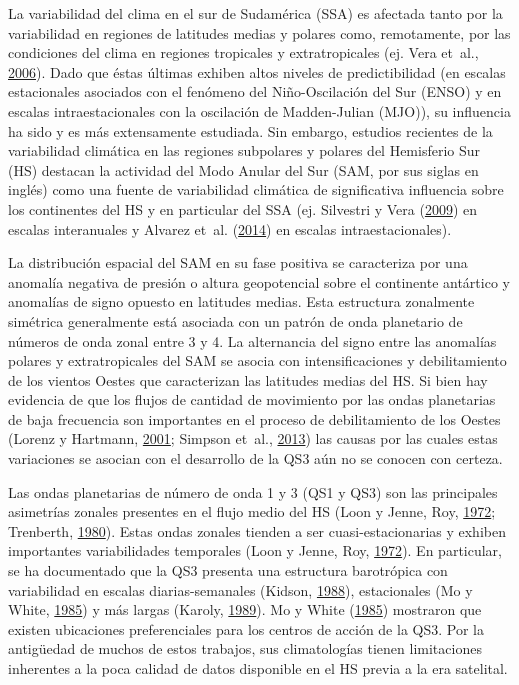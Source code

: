 \documentclass[spanish,a4paper,12pt,oneside]{book}
\begin{document}
La variabilidad del clima en el sur de Sudamérica (SSA) es afectada
tanto por la variabilidad en regiones de latitudes medias y polares
como, remotamente, por las condiciones del clima en regiones tropicales
y extratropicales (ej. Vera et~al.,
\protect\hyperlink{ref-Vera2006}{2006}). Dado que éstas últimas exhiben
altos niveles de predictibilidad (en escalas estacionales asociados con
el fenómeno del Niño-Oscilación del Sur (ENSO) y en escalas
intraestacionales con la oscilación de Madden-Julian (MJO)), su
influencia ha sido y es más extensamente estudiada. Sin embargo,
estudios recientes de la variabilidad climática en las regiones
subpolares y polares del Hemisferio Sur (HS) destacan la actividad del
Modo Anular del Sur (SAM, por sus siglas en inglés) como una fuente de
variabilidad climática de significativa influencia sobre los continentes
del HS y en particular del SSA (ej. Silvestri y Vera
(\protect\hyperlink{ref-Silvestri2009}{2009}) en escalas interanuales y
Alvarez et~al. (\protect\hyperlink{ref-Alvarez2014}{2014}) en escalas
intraestacionales).

La distribución espacial del SAM en su fase positiva se caracteriza por
una anomalía negativa de presión o altura geopotencial sobre el
continente antártico y anomalías de signo opuesto en latitudes medias.
Esta estructura zonalmente simétrica generalmente está asociada con un
patrón de onda planetario de números de onda zonal entre 3 y 4. La
alternancia del signo entre las anomalías polares y extratropicales del
SAM se asocia con intensificaciones y debilitamiento de los vientos
Oestes que caracterizan las latitudes medias del HS. Si bien hay
evidencia de que los flujos de cantidad de movimiento por las ondas
planetarias de baja frecuencia son importantes en el proceso de
debilitamiento de los Oestes (Lorenz y Hartmann,
\protect\hyperlink{ref-Lorenz2001}{2001}; Simpson et~al.,
\protect\hyperlink{ref-Simpson2013}{2013}) las causas por las cuales
estas variaciones se asocian con el desarrollo de la QS3 aún no se
conocen con certeza.

Las ondas planetarias de número de onda 1 y 3 (QS1 y QS3) son las
principales asimetrías zonales presentes en el flujo medio del HS (Loon
y Jenne, Roy, \protect\hyperlink{ref-Loon1972}{1972}; Trenberth,
\protect\hyperlink{ref-Trenberth1980a}{1980}). Estas ondas zonales
tienden a ser cuasi-estacionarias y exhiben importantes variabilidades
temporales (Loon y Jenne, Roy, \protect\hyperlink{ref-Loon1972}{1972}).
En particular, se ha documentado que la QS3 presenta una estructura
barotrópica con variabilidad en escalas diarias-semanales (Kidson,
\protect\hyperlink{ref-Kidson1988}{1988}), estacionales (Mo y White,
\protect\hyperlink{ref-Mo1985}{1985}) y más largas (Karoly,
\protect\hyperlink{ref-Karoly1989}{1989}). Mo y White
(\protect\hyperlink{ref-Mo1985}{1985}) mostraron que existen ubicaciones
preferenciales para los centros de acción de la QS3. Por la antigüedad
de muchos de estos trabajos, sus climatologías tienen limitaciones
inherentes a la poca calidad de datos disponible en el HS previa a la
era satelital.
\end{document}
